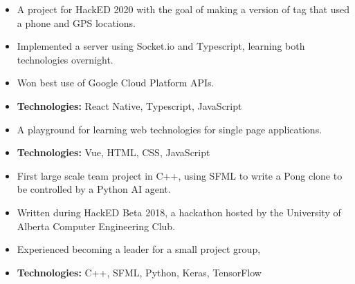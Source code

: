 \documentclass[10pt,a4paper,ragged2e,academicons,withhyper]{altacv}
\begin{document}

\makecvheader



\begin{paracol}{2}


  \begin{itemize}
    \item A project for HackED 2020 with the goal of making a version of tag that used a phone and GPS locations.
    \item Implemented a server using Socket.io and Typescript, learning both technologies overnight.
    \item Won best use of Google Cloud Platform APIs.
    \item \textbf{Technologies:} React Native, Typescript, JavaScript
  \end{itemize}
  \divider\small

  \begin{itemize}
    \item A playground for learning web technologies for single page applications.
    \item \textbf{Technologies:} Vue, HTML, CSS, JavaScript
  \end{itemize}
  \divider\small

  \begin{itemize}
    \item First large scale team project in C++, using SFML to write a Pong clone to be controlled by a Python AI agent.
    \item Written during HackED Beta 2018, a hackathon hosted by the University of Alberta Computer Engineering Club.
    \item Experienced becoming a leader for a small project group,
    \item \textbf{Technologies:} C++, SFML, Python, Keras, TensorFlow
  \end{itemize}
  \divider\small


\end{paracol}
\end{document}

